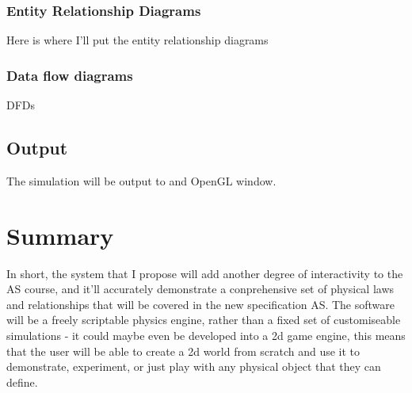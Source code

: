 \subsubsection{Entity Relationship Diagrams}
	Here is where I'll put the entity relationship diagrams

\subsubsection{Data flow diagrams}
	DFDs		


\subsection{Output}
	The simulation will be output to and OpenGL window.




\section{Summary}
In short, the system that I propose will add another degree of interactivity to the AS course, and it'll accurately demonstrate a conprehensive set of physical laws and relationships that will be covered in the new specification AS. The software will be a freely scriptable physics engine, rather than a fixed set of customiseable simulations - it could maybe even be developed into a 2d game engine, this means that the user will be able to create a 2d world from scratch and use it to demonstrate, experiment, or just play with any physical object that they can define.